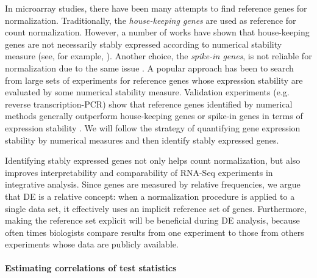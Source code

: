 In microarray studies, there have been many attempts to find reference genes for normalization.
Traditionally, the \textit{house-keeping genes}  are used as reference for count normalization.
However, a number of works have shown that house-keeping genes are not necessarily stably expressed
according to numerical stability measure (see, for example,
\cite{czechowski2005genome,huggett2005real}). Another choice, the \textit{spike-in genes}, is not
reliable for normalization due to the same issue \citep{risso2014nat}. A popular approach has been
to search from large sets of experiments for reference genes
\citep{czechowski2005genome,dekkers2012identification,frericks2008toolbox,gur2009identification,stamova2009identification}
whose expression stability are evaluated by some numerical stability measure. Validation experiments (e.g. reverse
transcription-PCR) show that reference genes identified by numerical methods generally outperform house-keeping genes or spike-in genes in terms of expression stability \citep{czechowski2005genome,hruz2011refgenes}.
We will follow the strategy of quantifying gene expression stability by numerical measures and
then identify stably expressed genes.

Identifying stably expressed genes not only helps count normalization, but also improves
interpretability and comparability of RNA-Seq experiments in integrative analysis. Since genes are
measured by relative frequencies, we argue that DE is a relative concept: when a normalization
procedure is applied to a single data set, it effectively uses an implicit reference set of genes.
Furthermore, making the reference set explicit will be beneficial during DE analysis, because often times biologists compare results from one experiment to those from others experiments whose data are publicly
available. 

\paragraph{Estimating correlations of test statistics}

